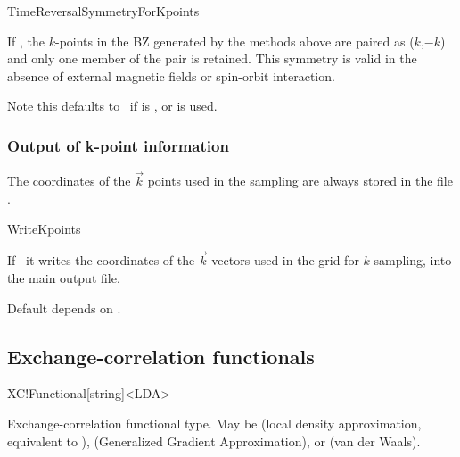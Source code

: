 \begin{fdflogicalT}{TimeReversalSymmetryForKpoints}

  If \fdftrue, the $k$-points in the BZ generated by the methods above
  are paired as ($k$,$-k$) and only one member of the pair is
  retained. This symmetry is valid in the absence of external magnetic
  fields or spin-orbit interaction.

  Note this defaults to \fdffalse\ if  is
  ,  or  is  used.

\end{fdflogicalT}


\subsubsection{Output of k-point information}

The coordinates of the $\vec k$ points used in the sampling
are always stored in the file .

\begin{fdflogicalF}{WriteKpoints}
  
  If \fdftrue\ it writes the coordinates of the $\vec k$ vectors used
  in the grid for $k$-sampling, into the main output file.
  
  Default depends on .

\end{fdflogicalF}



\subsection{Exchange-correlation functionals}


\begin{fdfentry}{XC!Functional}[string]<LDA>
  
  Exchange-correlation functional type. May be  (local
  density approximation, equivalent to ), 
  (Generalized Gradient Approximation), or  (van der
  Waals).

\end{fdfentry}

